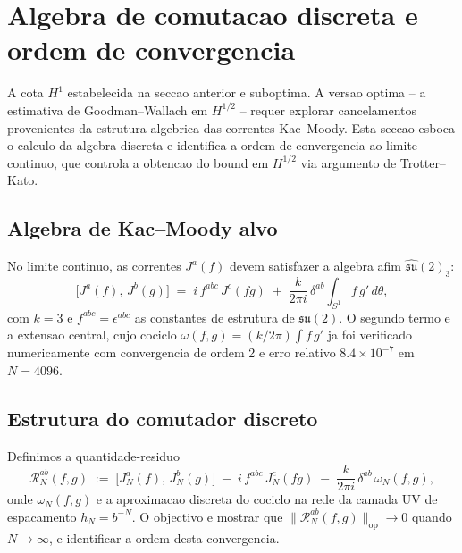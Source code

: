 %
%

\section{Algebra de comutacao discreta e ordem de convergencia}
\label{sec:algebra_discreta}

A cota $H^1$ estabelecida na seccao anterior e suboptima.
A versao optima -- a estimativa de Goodman--Wallach \cite{GW1985} em
$H^{1/2}$ -- requer explorar cancelamentos provenientes da estrutura
algebrica das correntes Kac--Moody. Esta seccao esboca o calculo da
algebra discreta e identifica a ordem de convergencia ao limite
continuo, que controla a obtencao do bound em $H^{1/2}$ via
argumento de Trotter--Kato.

\subsection{Algebra de Kac--Moody alvo}

No limite continuo, as correntes $J^a(f)$ devem satisfazer a algebra
afim $\widehat{\mathfrak{su}}(2)_3$:
\begin{equation}
  \bigl[J^a(f),\,J^b(g)\bigr]
  \;=\; i\,f^{abc}\,J^c(fg)
  \;+\; \frac{k}{2\pi i}\,\delta^{ab}\!\int_{S^1}\! f\,g'\,d\theta,
  \label{eq:KM_alvo}
\end{equation}
com $k = 3$ e $f^{abc} = \epsilon^{abc}$ as constantes de estrutura
de $\mathfrak{su}(2)$. O segundo termo e a extensao central, cujo
cociclo $\omega(f,g) = (k/2\pi)\!\int\! f\,g'$ ja foi verificado
numericamente com convergencia de ordem 2 e erro relativo
$8.4\times 10^{-7}$ em $N=4096$.

\subsection{Estrutura do comutador discreto}

Definimos a quantidade-residuo
\begin{equation}
  \mathcal{R}_N^{ab}(f,g) \;:=\;
  \bigl[J_N^a(f),\,J_N^b(g)\bigr]
  \;-\; i\,f^{abc}\,J_N^c(fg)
  \;-\; \frac{k}{2\pi i}\,\delta^{ab}\,\omega_N(f,g),
  \label{eq:def_residuo_algebra}
\end{equation}
onde $\omega_N(f,g)$ e a aproximacao discreta do cociclo na rede
da camada UV de espacamento $h_N = b^{-N}$. O objectivo e mostrar
que $\|\mathcal{R}_N^{ab}(f,g)\|_{\mathrm{op}} \to 0$ quando
$N \to \infty$, e identificar a ordem desta convergencia.

